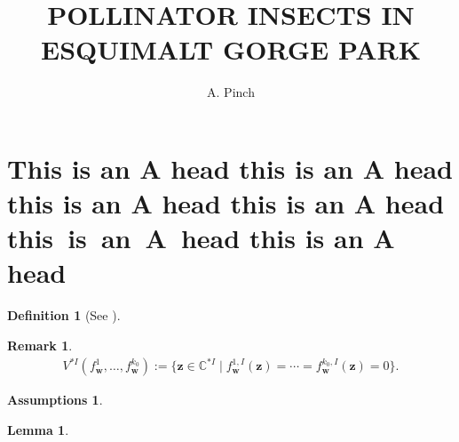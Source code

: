 \documentclass{CUP-JNL-NMJ}%
\theoremstyle{cupplain}
\newtheorem{lemma}[theorem]{Lemma}
\theoremstyle{cupremark}
\newtheorem{remark}[theorem]{Remark}
\newtheorem{assumption}[theorem]{Assumptions}
\theoremstyle{cupdefinition}
\newtheorem{definition}[theorem]{Definition} %
\theoremstyle{cupproof}
\numberwithin{equation}{section}
\begin{document}
\begin{Frontmatter}

\title[Article Title]{POLLINATOR INSECTS IN ESQUIMALT GORGE PARK}

\author{A. Pinch}






\end{Frontmatter}

\section[This is an A Head]{This is an A head this is an A head this is an A head this is an A head  this~is~an~A~head this is an A head}\label{sec2}
\lipsum[1]

\begin{definition}[{See \cite{r5}}]\label{definition1}\lipsum[4]\end{definition}

\begin{remark}\lipsum[5] 
\begin{align*} V^{*I}(f^1_{\mathbf{w}},\ldots,f^{k_0}_{\mathbf{w}}):=\{\mathbf{z}\in\mathbb{C}^{*I}\mid f^{1,I}_{\mathbf{w}}(\mathbf{z}) = \cdots = f^{k_0,I}_{\mathbf{w}}(\mathbf{z})=0\}. \end{align*}
\lipsum[6]\end{remark}

\begin{assumption}\label{asm1}\lipsum[7]\end{assumption}

\lipsum[8]

\begin{lemma}\label{lemma1}\lipsum[9] 
\end{lemma}

\lipsum[10]
\end{document}
